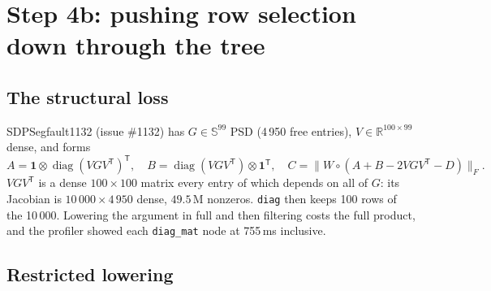 \documentclass[11pt,a4paper]{article}
\newcommand{\R}{\mathbb{R}}
\newcommand{\code}[1]{\texttt{#1}}
\newcommand{\T}{\mathsf{T}}
\begin{document}
\section{Step 4b: pushing row selection down through the tree}
\label{sec:pushdown}

\subsection{The structural loss}

SDPSegfault1132 (issue \#1132) has $G \in \mathbb{S}^{99}$ PSD (4\,950 free entries),
$V \in \R^{100\times99}$ dense, and forms
\begin{equation}
  \label{eq:sdp}
  A = \mathbf{1}\otimes \operatorname{diag}(VGV^\T)^\T,\quad
  B = \operatorname{diag}(VGV^\T)\otimes \mathbf{1}^\T,\quad
  C = \big\| W \circ (A + B - 2VGV^\T - D) \big\|_F .
\end{equation}
$VGV^\T$ is a dense $100\times100$ matrix every entry of which depends on all of $G$: its Jacobian
is $10\,000 \times 4\,950$ dense, $49.5$\,M nonzeros. \code{diag} then keeps 100 rows of the
10\,000. Lowering the argument in full and then filtering costs the full product, and the profiler
showed each \code{diag\_mat} node at 755\,ms inclusive.

\subsection{Restricted lowering}
\end{document}
